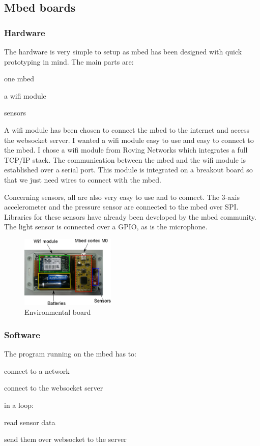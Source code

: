 \documentclass[pdftex,10pt,a4paper]{report}
\newenvironment{packed_item}{
\begin{itemize}
  \setlength{\itemsep}{1pt}
  \setlength{\parskip}{0pt}
  \setlength{\parsep}{0pt}
}{\end{itemize}}
\begin{document}
\subsection{Mbed boards}
\subsubsection{Hardware}
The hardware is very simple to setup as mbed has been designed with quick prototyping in mind. The main parts are:
\begin{packed_item}
	\item one mbed
	\item a wifi module
	\item sensors
\end{packed_item}

A wifi module has been chosen to connect the mbed to the internet and access the websocket server. I wanted a wifi module easy to use and easy to connect to the mbed. I chose a wifi module from Roving Networks which integrates a full TCP/IP stack. The communication between the mbed and the wifi module is established over a serial port. This module is integrated on a breakout board so that we just need wires to connect with the mbed. 

Concerning sensors, all are also very easy to use and to connect. The 3-axis accelerometer and the pressure sensor are connected to the mbed over SPI. Libraries for these sensors have already been developed by the mbed community. The light sensor is connected over a GPIO, as is the microphone. 


\begin{figure}[h!]
		\centering
		\includegraphics[width=0.4\textwidth]{./env_board.png}
		\caption{Environmental board}
		\label{Environmental board}
\end{figure}


\subsubsection{Software}
The program running on the mbed has to:
\begin{packed_item}
	\item connect to a network
	\item connect to the websocket server
	\item in a loop:
		\begin{packed_item}
			\item read sensor data
			\item send them over websocket to the server
		\end{packed_item}
\end{packed_item}
\end{document}
